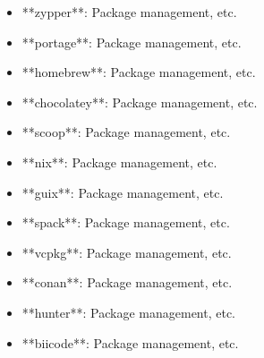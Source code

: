 \documentclass[11pt,a4paper]{article}
\begin{document}
\begin{itemize}
\item **zypper**: Package management, etc.
\end{itemize}

\begin{itemize}
\item **portage**: Package management, etc.
\end{itemize}

\begin{itemize}
\item **homebrew**: Package management, etc.
\end{itemize}

\begin{itemize}
\item **chocolatey**: Package management, etc.
\end{itemize}

\begin{itemize}
\item **scoop**: Package management, etc.
\end{itemize}

\begin{itemize}
\item **nix**: Package management, etc.
\end{itemize}

\begin{itemize}
\item **guix**: Package management, etc.
\end{itemize}

\begin{itemize}
\item **spack**: Package management, etc.
\end{itemize}

\begin{itemize}
\item **vcpkg**: Package management, etc.
\end{itemize}

\begin{itemize}
\item **conan**: Package management, etc.
\end{itemize}

\begin{itemize}
\item **hunter**: Package management, etc.
\end{itemize}

\begin{itemize}
\item **biicode**: Package management, etc.
\end{itemize}
\end{document}
